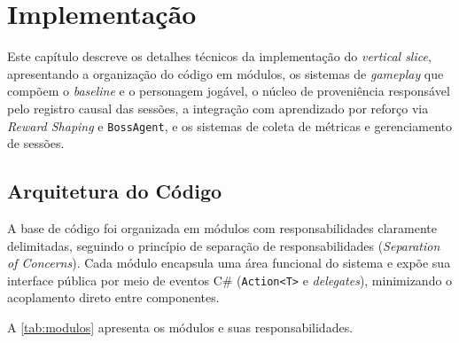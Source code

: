 \chapter{Implementação}
\label{cap:implementacao}

Este capítulo descreve os detalhes técnicos da implementação do
\textit{vertical slice}, apresentando a organização do código em módulos, os
sistemas de \textit{gameplay} que compõem o \textit{baseline} e o personagem
jogável, o núcleo de proveniência responsável pelo registro causal das
sessões, a integração com aprendizado por reforço via \textit{Reward Shaping}
e \texttt{BossAgent}, e os sistemas de coleta de métricas e gerenciamento de
sessões.

\section{Arquitetura do Código}
\label{sec:arquitetura-codigo}

A base de código foi organizada em módulos com responsabilidades claramente
delimitadas, seguindo o princípio de separação de responsabilidades
(\textit{Separation of Concerns}). Cada módulo encapsula uma área funcional
do sistema e expõe sua interface pública por meio de eventos C\#
(\texttt{Action<T>} e \textit{delegates}), minimizando o acoplamento direto
entre componentes.

A \autoref{tab:modulos} apresenta os módulos e suas responsabilidades.

